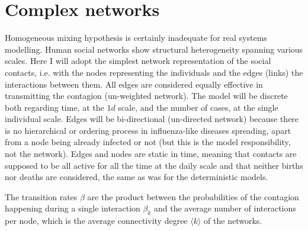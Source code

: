 \documentclass[DIV=12, BCOR=0pt]{scrartcl}  %
\begin{document}
  

  
  \section{Complex networks}
  \label{sec:network}
  Homogeneous mixing hypothesis is certainly inadequate for real systems modelling. Human social networks %
  show structural heterogeneity spanning various scales. Here I will adopt the simplest network representation of the social contacts, i.e. with the nodes representing the individuals and the edges (links) the %
  interactions between them. All edges are considered equally effective in transmitting the contagion (un-weighted network). The model will be discrete both regarding time, at the $1 d$ scale, and the number of cases, at the single individual scale. Edges will be bi-directional (un-directed network) because there is no hierarchical or ordering process in influenza-like diseases spreading, apart from a node being already infected or not (but this is the model responsibility, not the network). Edges and nodes are static in time, meaning that contacts are supposed to be all active for all the time at the daily scale and that neither births nor deaths are considered, the same as was for the deterministic models. %
  
  The transition rates $\beta$ are the product between the probabilities of the contagion happening during a single interaction $\beta_k$ and the average number of interactions per node, which is the average connectivity degree $\langle k \rangle$ of the networks.
  
  
\end{document}
